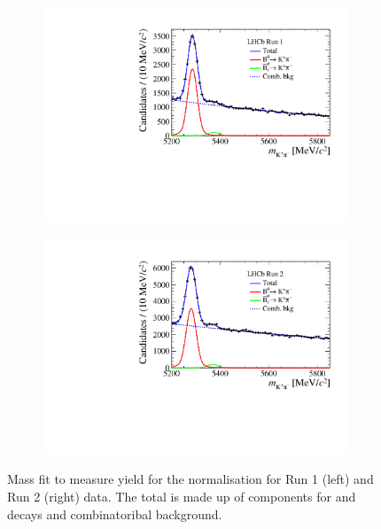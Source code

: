 {{\begin{figure}[htbp]
    \centering
  \begin{subfigure}[b]{0.48\textwidth}
        \includegraphics[width=  \textwidth]{./Figs/BFAnalysis/Bd2KPi_mass_RunI_BDTbinNone.pdf}
    \end{subfigure}
    \begin{subfigure}[b]{0.48\textwidth}
       \includegraphics[width=\textwidth]{./Figs/BFAnalysis/Bd2KPi_mass_RunII_BDTbinNone.pdf}
   \end{subfigure}
    \caption{Mass fit to measure \bdkpi yield for the normalisation for Run 1 (left) and Run 2 (right) data. The total \pdf is made up of components for \bdkpi and \bskpi decays and combinatoribal background.}
    \label{fig:Bdkpiyield}
\end{figure}



}}

